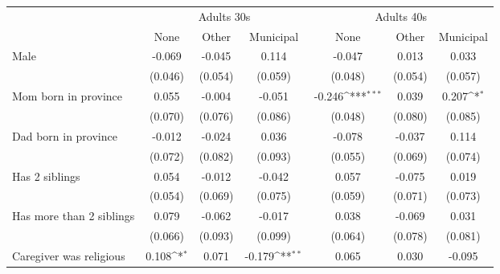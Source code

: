{
\def\sym#1{\ifmmode^{#1}\else\(^{#1}\)\fi}
\begin{tabular}{l*{6}{c}}
\toprule
		& \multicolumn{3}{c}{Adults 30s} &  \multicolumn{3}{c}{Adults 40s} \\
                    &\multicolumn{1}{c}{None}&\multicolumn{1}{c}{Other}&\multicolumn{1}{c}{Municipal}&\multicolumn{1}{c}{None}&\multicolumn{1}{c}{Other}&\multicolumn{1}{c}{Municipal}\\
\midrule
Male                &      -0.069         &      -0.045         &       0.114         &      -0.047         &       0.013         &       0.033         \\
                    &     (0.046)         &     (0.054)         &     (0.059)         &     (0.048)         &     (0.054)         &     (0.057)         \\
\addlinespace
Mom born in province&       0.055         &      -0.004         &      -0.051         &      -0.246\sym{***}&       0.039         &       0.207\sym{*}  \\
                    &     (0.070)         &     (0.076)         &     (0.086)         &     (0.048)         &     (0.080)         &     (0.085)         \\
\addlinespace
Dad born in province&      -0.012         &      -0.024         &       0.036         &      -0.078         &      -0.037         &       0.114         \\
                    &     (0.072)         &     (0.082)         &     (0.093)         &     (0.055)         &     (0.069)         &     (0.074)         \\
\addlinespace
Has 2 siblings      &       0.054         &      -0.012         &      -0.042         &       0.057         &      -0.075         &       0.019         \\
                    &     (0.054)         &     (0.069)         &     (0.075)         &     (0.059)         &     (0.071)         &     (0.073)         \\
\addlinespace
Has more than 2 siblings&       0.079         &      -0.062         &      -0.017         &       0.038         &      -0.069         &       0.031         \\
                    &     (0.066)         &     (0.093)         &     (0.099)         &     (0.064)         &     (0.078)         &     (0.081)         \\
\addlinespace
Caregiver was religious&       0.108\sym{*}  &       0.071         &      -0.179\sym{**} &       0.065         &       0.030         &      -0.095         \\

\end{tabular}}
